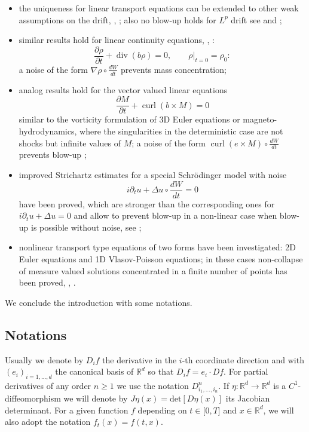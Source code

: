 \documentclass{article}
\begin{document}
\begin{itemize}
\item the uniqueness for linear transport equations can be extended to other
weak assumptions on the drift, \cite{AF}, \cite{Mau1}; also no blow-up holds
for $L^{p}$ drift see \cite{FeFla} and  \cite{pro};

\item similar results hold for linear continuity equations, \cite{FGP cont},
\cite{Mau2}:
\[
\frac{\partial\rho}{\partial t}+\operatorname{div}\left(  b\rho\right)
=0,\qquad\rho|_{t=0}=\rho_{0}:
\]
a noise of the form $\nabla\rho\circ\frac{dW}{dt}$ prevents mass concentration;

\item analog results hold for the vector valued linear equations%
\[
\frac{\partial M}{\partial t}+\operatorname{curl}\left(  b\times M\right)  =0
\]
similar to the vorticity formulation of 3D Euler equations or
magneto-hydrodynamics, where the singularities in the deterministic case are
not shocks but infinite values of $M$; a noise of the form
$\operatorname{curl}\left(  e\times M\right)  \circ\frac{dW}{dt}$ prevents
blow-up \cite{F Nek};

\item improved Strichartz estimates for a special Schr\"{o}dinger model with
noise%
\[
i\partial_{t}u+\Delta u\circ\frac{dW}{dt}=0
\]
have been proved, which are stronger than the corresponding ones for
$i\partial_{t}u+\Delta u=0$ and allow to prevent blow-up in a non-linear case
when blow-up is possible without noise, see \cite{DT10};

\item nonlinear transport type equations of two forms have been investigated:
2D Euler equations and 1D Vlasov-Poisson equations; in these cases non-collapse
of measure valued solutions concentrated in a finite number of points has been
proved, \cite{FGP Euler}, \cite{DFV}.
\end{itemize}
We conclude the introduction with some notations.

\subsection {Notations} \label{sect notations} Usually we
denote by $D_{i}f$ the derivative in the $i$-th coordinate direction
and with $(e_{i})_{i=1,\dots,d}$ the canonical basis of
$\mathbb{R}^{d}$ so that $D_{i}f=e_{i}\cdot Df$. For partial
derivatives of any order $n\geq1$ we use the notation $D_{i_{1},...,i_{n}}%
^{n}$. If $\eta:\mathbb{R}^{d}\rightarrow\mathbb{R}^{d}$ is a $C^{1}%
$-diffeomorphism we will denote by $J\eta(x)=\text{det}[D\eta(x)]$ its
Jacobian determinant. For a given function $f$ depending on $t\in\lbrack0,T]$
and $x\in{\mathbb{R}}^{d}$, we will also adopt the notation $f_{t}(x)=f(t,x)$.
\end{document}
